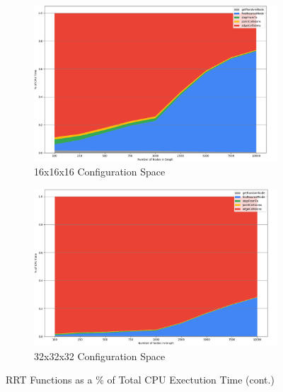 \newpage
\begin{figure}[H]\ContinuedFloat
\begin{center}
    \begin{subfigure}{\textwidth}
    \begin{center}
    \includegraphics[draft=false,width=\linewidth,height=0.3\paperheight]{chapters/chapter2/img/profiling/16x16x16/performance.png}
    \caption{16x16x16 Configuration Space}
    \label{subfig:16x16x16rrt}
    \end{center}
    \end{subfigure}
    \begin{subfigure}{\textwidth}
    \begin{center}
    \includegraphics[draft=false,width=\linewidth,height=0.3\paperheight]{chapters/chapter2/img/profiling/32x32x32/performance.png}
    \caption{32x32x32 Configuration Space}
    \label{subfig:32x32x32rrt}
    \end{center}
    \end{subfigure} 
    
    \caption{\ac{RRT} Functions as a \% of Total CPU Exectution Time (cont.)}
    \label{fig:rrt_profiling}
\end{center}
\end{figure}
